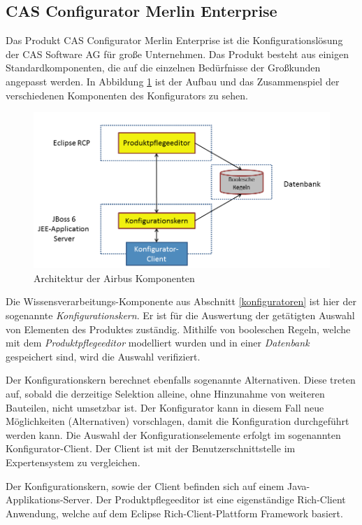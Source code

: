 \subsection{CAS Configurator Merlin Enterprise} \label{configurator}
Das Produkt CAS Configurator Merlin Enterprise ist die Konfigurationslösung der CAS Software AG für große Unternehmen. Das Produkt besteht aus einigen Standardkomponenten, die auf die einzelnen Bedürfnisse der Großkunden angepasst werden. In Abbildung \ref{airbus_structure} ist der Aufbau und das Zusammenspiel der verschiedenen Komponenten des Konfigurators zu sehen. \par
\begin{figure}[H]
\centering
\includegraphics[width=\hsize]{images/AirbusAufbau}
\caption{Architektur der Airbus Komponenten}
\label{airbus_structure}
\end{figure}
Die Wissensverarbeitungs-Komponente aus Abschnitt \ref{konfiguratoren} ist hier der sogenannte \textit{Konfigurationskern}. Er ist für die Auswertung der getätigten Auswahl von Elementen des Produktes zuständig. Mithilfe von booleschen Regeln, welche mit dem \textit{Produktpflegeeditor} modelliert wurden und in einer \textit{Datenbank} gespeichert sind, wird die Auswahl verifiziert.
\par
 Der Konfigurationskern berechnet ebenfalls sogenannte Alternativen. Diese treten auf, sobald die derzeitige Selektion alleine, ohne Hinzunahme von weiteren Bauteilen, nicht umsetzbar ist. Der Konfigurator kann in diesem Fall neue Möglichkeiten (Alternativen) vorschlagen, damit die Konfiguration durchgeführt werden kann. Die Auswahl der Konfigurationselemente erfolgt im sogenannten Konfigurator-Client. Der Client ist mit der Benutzerschnittstelle im Expertensystem zu vergleichen. \par

Der Konfigurationskern, sowie der Client befinden sich auf einem Java-Applikations-Server. Der Produktpflegeeditor ist eine eigenständige Rich-Client Anwendung, welche auf dem Eclipse Rich-Client-Plattform Framework\cite{bib:eclipseRCP} basiert.

